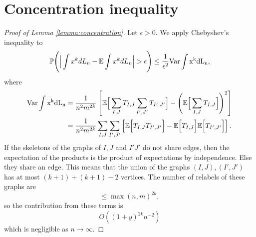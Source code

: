 \documentclass[11pt,openany]{article}
\begin{document}
\section{Concentration inequality}
\begin{proof}[Proof of Lemma \ref{lemma:concentration}]
    Let $\epsilon>0$. We apply Chebyshev's inequality to \begin{align*}
        \mathbb{P}\Bigg(\Big|\int x^k dL_n - \mathbb{E}\int x^k dL_n\Big|>\epsilon\Bigg)\leq \frac{1}{\epsilon^2} \rm{Var}\int x^k dL_n ,
    \end{align*}
    where \begin{align*}
        \rm{Var}\int x^k dL_n &= \frac{1}{n^2m^{2k}}\left[\mathbb{E}\Big[\sum_{I,J} T_{I,J}\sum_{I',J'} T_{I',J'}\Big]-\Bigg(\mathbb{E}\Big[\sum_{I,J} T_{I,J}\Big]\Bigg)^2\right]\\
        & = \frac{1}{n^2m^{2k}}\sum_{I,J}\sum_{I',J'}\left[\mathbb{E}\Big[ T_{I,J} T_{I',J'}\Big]-\mathbb{E}\Big[ T_{I,J}\Big]\mathbb{E}\Big[ T_{I',J'}\Big]\right].
    \end{align*}
    If the skeletons of the graphs of $I,J$ and $I'J'$ do not share edges, then the expectation of the products is the product of expectations by independence. Else
    they share an edge. This means that the union of the graphs $(I,J),(I',J')$ has at most $(k+1)+(k+1)-2$ vertices. The number of relabels of these graphs are \[
    \leq \max(n,m)^{2k}, 
    \] 
    so the contribution from these terms is \[
    O((1+y)^{2k} n^{-2})
    \]
    which is negligible as $n\to \infty$.
\end{proof}
\printbibliography
\end{document}
